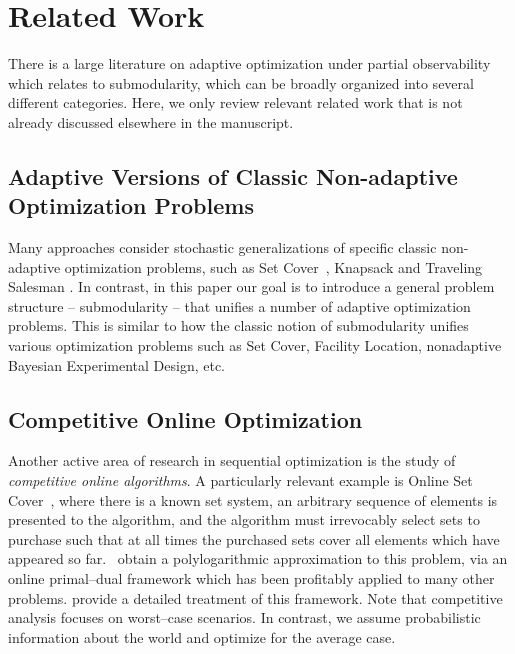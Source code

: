 
\section{Related Work} \label{sec:related-work}
There is a large literature on adaptive optimization under partial
observability which relates to \term submodularity, which can be broadly organized into several different categories. Here, we only review relevant related work that is not already discussed elsewhere in the manuscript.

\subsection{Adaptive Versions of Classic Non-adaptive Optimization Problems} Many approaches consider stochastic generalizations of specific classic non-adaptive optimization problems, such as Set Cover~\citep{goemans06stochastic,liu08near}, Knapsack \citep{dean08approximating,dean05adaptivity} and Traveling Salesman \citep{gupta10approximation}. In contrast, in this paper our goal is to introduce a general problem structure -- \term submodularity -- that unifies a number of adaptive optimization problems. This is similar to how the classic notion of submodularity unifies various optimization problems such as Set Cover, Facility Location, nonadaptive Bayesian Experimental Design, etc.

\subsection{Competitive Online Optimization}  Another active area of
research in sequential optimization is the study of \emph{competitive
  online algorithms}.  
A particularly relevant example is Online Set Cover~\cite{alon09},
where there is a known set system, an arbitrary sequence of elements
is presented to the algorithm, and the algorithm must irrevocably
select sets to purchase such that at all times the purchased sets
cover all elements which have appeared so far.  \citet{alon09}~obtain a
polylogarithmic approximation to this problem, via an online
primal--dual framework which has been profitably applied to many other
problems.  \citet{buchbinder2009} provide a detailed treatment of this
framework.  Note that competitive analysis focuses on worst--case
scenarios.  In contrast, we assume probabilistic information about the
world and optimize for the average case.


